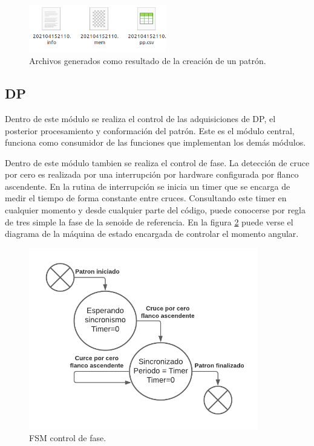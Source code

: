 \vspace{5mm}

\begin{figure}[ht]
	\centering
	\includegraphics[width=60mm]{./Figures/firmFiles.png}
	\caption{Archivos generados como resultado de la creación de un patrón.}
	\label{fig:firmFiles}
\end{figure}

\subsection{DP}

Dentro de este módulo se realiza el control de las adquisiciones de DP, el posterior procesamiento y conformación del patrón. Este es el módulo central, funciona como consumidor de las funciones que implementan los demás módulos.

Dentro de este módulo tambien se realiza el control de fase. La detección de cruce por cero es realizada por una interrupción por hardware configurada por flanco ascendente. En la rutina de interrupción se inicia un timer que se encarga de medir el tiempo de forma constante entre cruces. Consultando este timer en cualquier momento y desde cualquier parte del código, puede conocerse por regla de tres simple la fase de la senoide de referencia. En la figura \ref{fig:firmFSM} puede verse el diagrama de la máquina de estado encargada de controlar el momento angular.

\begin{figure}[ht]
	\centering
	\includegraphics[width=100mm]{./Figures/firmZCFSM.png}
	\caption{FSM control de fase.}
	\label{fig:firmFSM}
\end{figure}

